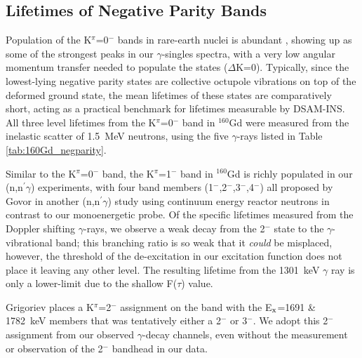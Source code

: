 \subsection{Lifetimes of Negative Parity Bands}

Population of the K$^\pi$=0$^-$ bands in rare-earth nuclei is abundant \cite{Zilges_K0dipole}, showing up as some of the strongest peaks in our $\gamma$-singles spectra, with a very low angular momentum transfer needed to populate the states ($\Delta$K=0). Typically, since the lowest-lying negative parity states are collective octupole vibrations on top of the deformed ground state, the mean lifetimes of these states are comparatively short, acting as a practical benchmark for lifetimes measurable by DSAM-INS. All three level lifetimes from the K$^\pi$=0$^-$ band in $^{160}$Gd were measured from the inelastic scatter of 1.5~MeV neutrons, using the five $\gamma$-rays listed in Table \ref{tab:160Gd_negparity}.

Similar to the K$^\pi$=0$^-$ band, the K$^\pi$=1$^-$ band in $^{160}$Gd is richly populated in our (n,n$^\prime\gamma$) experiments, with four band members (1$^-$,2$^-$,3$^-$,4$^-$) all proposed by Govor in another (n,n$^\prime\gamma$) study \cite{Govor_160Gd_2009} using continuum energy reactor neutrons in contrast to our monoenergetic probe. Of the specific lifetimes measured from the Doppler shifting $\gamma$-rays, we observe a weak decay from the 2$^-$ state to the $\gamma$-vibrational band; this branching ratio is so weak that it \textit{could} be misplaced, however, the threshold of the de-excitation in our excitation function does not place it leaving any other level. The resulting lifetime from the 1301~keV $\gamma$ ray is only a lower-limit due to the shallow F($\tau$) value.

Grigoriev \cite{Grigoriev2012} places a K$^\pi$=2$^-$ assignment on the band with the E$_{\rm x}$=1691 \& 1782~keV members that was tentatively either a 2$^-$ or 3$^-$. We adopt this 2$^-$ assignment from our observed $\gamma$-decay channels, even without the measurement or observation of the 2$^-$ bandhead in our data.

